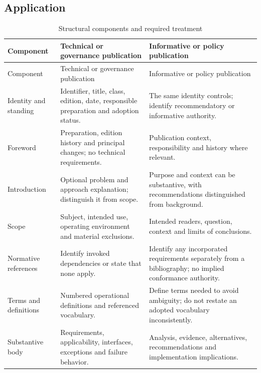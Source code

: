 \documentclass[11pt,a4paper]{article}
\begin{document}
\label{ann:structure}
\subsection{Application}

\begin{longtable}{L{0.22\textwidth}L{0.35\textwidth}L{0.35\textwidth}}
\caption{Structural components and required treatment}\label{tab:structure}\\
\toprule Component & Technical or governance publication & Informative or policy publication\\\midrule\endfirsthead
\toprule Component & Technical or governance publication & Informative or policy publication\\\midrule\endhead
Identity and standing & Identifier, title, class, edition, date, responsible preparation and adoption status. & The same identity controls; identify recommendatory or informative authority.\\
Foreword & Preparation, edition history and principal changes; no technical requirements. & Publication context, responsibility and history where relevant.\\
Introduction & Optional problem and approach explanation; distinguish it from scope. & Purpose and context can be substantive, with recommendations distinguished from background.\\
Scope & Subject, intended use, operating environment and material exclusions. & Intended readers, question, context and limits of conclusions.\\
Normative references & Identify invoked dependencies or state that none apply. & Identify any incorporated requirements separately from a bibliography; no implied conformance authority.\\
Terms and definitions & Numbered operational definitions and referenced vocabulary. & Define terms needed to avoid ambiguity; do not restate an adopted vocabulary inconsistently.\\
Substantive body & Requirements, applicability, interfaces, exceptions and failure behavior. & Analysis, evidence, alternatives, recommendations and implementation implications.\\

\end{longtable}
\end{document}
